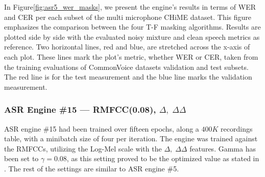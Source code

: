 In Figure\;\ref{fig:asr5_wer_masks}, we present the engine's
results in terms of WER and CER per each subset of
the multi microphone CHiME dataset.
This figure emphasizes the comparison between the
four T-F masking algorithms. Results are plotted side by side with
the evaluated noisy mixture and clean speech metrics as reference.
Two horizontal lines, red and blue, are stretched across the x-axis
of each plot. These lines mark the plot's metric, 
whether WER or CER, taken from the training evaluations of 
CommonVoice datasets validation and test subsets.
The red line is for the test measurement
and the blue line marks the validation measurement.

\subsubsection{ASR Engine \#15 --- RMFCC(0.08), \(\Delta,\;\Delta\Delta\)}
ASR engine \#15 had been trained over fifteen epochs,
along a \(400K\) recordings table, with a minibatch size 
of four per iteration. 
The engine was trained against the RMFCCs,
utilizing the Log-Mel scale with the \(\Delta,\;\Delta\Delta\) features.
Gamma has been set to
\(\gamma=0.08\), as this setting proved to be
the optimized value as stated in \cite{rmfcc1}.
The rest of the settings are similar to
ASR engine \#5. 
\bigskip

